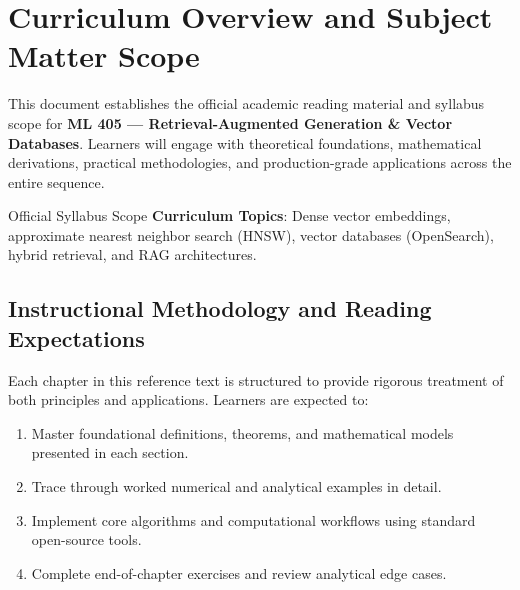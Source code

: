 \section{Curriculum Overview and Subject Matter Scope}

This document establishes the official academic reading material and syllabus scope for \textbf{ML 405 --- Retrieval-Augmented Generation \& Vector Databases}. Learners will engage with theoretical foundations, mathematical derivations, practical methodologies, and production-grade applications across the entire sequence.

\begin{InsightBox}{Official Syllabus Scope}
  \textbf{Curriculum Topics}: Dense vector embeddings, approximate nearest neighbor search (HNSW), vector databases (OpenSearch), hybrid retrieval, and RAG architectures.
\end{InsightBox}

\subsection{Instructional Methodology and Reading Expectations}

Each chapter in this reference text is structured to provide rigorous treatment of both principles and applications. Learners are expected to:
\begin{enumerate}
  \item Master foundational definitions, theorems, and mathematical models presented in each section.
  \item Trace through worked numerical and analytical examples in detail.
  \item Implement core algorithms and computational workflows using standard open-source tools.
  \item Complete end-of-chapter exercises and review analytical edge cases.
\end{enumerate}


